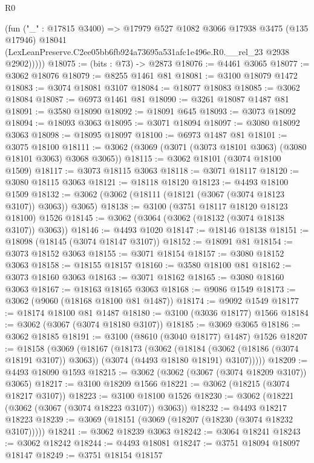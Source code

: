\begin{lexlean}{R0}
\begin{coremodule}
          (fun ("_" : @17815 @3400) =>
          @17979
            @527
            @1082
            @3066
            @17938
            @3475
            (@135 @17946)
            @18041
            (LexLeanPreserve.C2ee05bb6fb924a73695a531afc1e496e.R0.__rel_23 @2938 @2902)))))
@18075 := (bits : @73) -> @2873
@18076 := @4461 @3065
@18077 := @3062 @18076
@18079 := @8255 @1461 @81
@18081 := @3100 @18079 @1472
@18083 := @3074 @18081 @3107
@18084 := @18077 @18083
@18085 := @3062 @18084
@18087 := @6973 @1461 @81
@18090 := @3261 @18087 @1487 @81
@18091 := @3580 @18090
@18092 := @18091 @645
@18093 := @3073 @18092
@18094 := @18093 @3063
@18095 := @3071 @18094
@18097 := @3080 @18092 @3063
@18098 := @18095 @18097
@18100 := @6973 @1487 @81
@18101 := @3075 @18100
@18111 := @3062 (@3069 (@3071 (@3073 @18101 @3063) (@3080 @18101 @3063) @3068 @3065))
@18115 := @3062 @18101 (@3074 @18100 @1509)
@18117 := @3073 @18115 @3063
@18118 := @3071 @18117
@18120 := @3080 @18115 @3063
@18121 := @18118 @18120
@18123 := @4493 @18100 @1509
@18132 := @3062 (@3062 (@18111 (@18121 (@3067 (@3074 @18123 @3107)) @3063)) @3065)
@18138 := @3100 (@3751 @18117 @18120 @18123 @18100) @1526
@18145 := @3062 (@3064 (@3062 (@18132 (@3074 @18138 @3107)) @3063))
@18146 := @4493 @1020
@18147 := @18146 @18138
@18151 := @18098 (@18145 (@3074 @18147 @3107))
@18152 := @18091 @81
@18154 := @3073 @18152 @3063
@18155 := @3071 @18154
@18157 := @3080 @18152 @3063
@18158 := @18155 @18157
@18160 := @3580 @18100 @81
@18162 := @3073 @18160 @3063
@18163 := @3071 @18162
@18165 := @3080 @18160 @3063
@18167 := @18163 @18165 @3063
@18168 := @9086 @1549
@18173 := @3062 (@9060 (@18168 @18100 @81 @1487))
@18174 := @9092 @1549
@18177 := @18174 @18100 @81 @1487
@18180 := @3100 (@3036 @18177) @1566
@18184 := @3062 (@3067 (@3074 @18180 @3107))
@18185 := @3069 @3065
@18186 := @3062 @18185
@18191 := @3100 (@8610 (@3040 @18177) @1487) @1526
@18207 := @18158
    (@3069
      (@18167
        (@18173
          (@3062
            (@18184 (@3062 (@18186 (@3074 @18191 @3107)) @3063))
            (@3074 (@4493 @18180 @18191) @3107)))))
@18209 := @4493 @18090 @1593
@18215 := @3062 (@3062 (@3067 (@3074 @18209 @3107)) @3065)
@18217 := @3100 @18209 @1566
@18221 := @3062 (@18215 (@3074 @18217 @3107))
@18223 := @3100 @18100 @1526
@18230 := @3062 (@18221 (@3062 (@3067 (@3074 @18223 @3107)) @3063))
@18232 := @4493 @18217 @18223
@18239 := @3069 (@18151 (@3069 (@18207 (@18230 (@3074 @18232 @3107)))))
@18241 := @3062 @18239 @3063
@18242 := @3064 @18241
@18243 := @3062 @18242
@18244 := @4493 @18081
@18247 := @3751 @18094 @18097 @18147
@18249 := @3751 @18154 @18157

\end{coremodule}
\end{lexlean}

